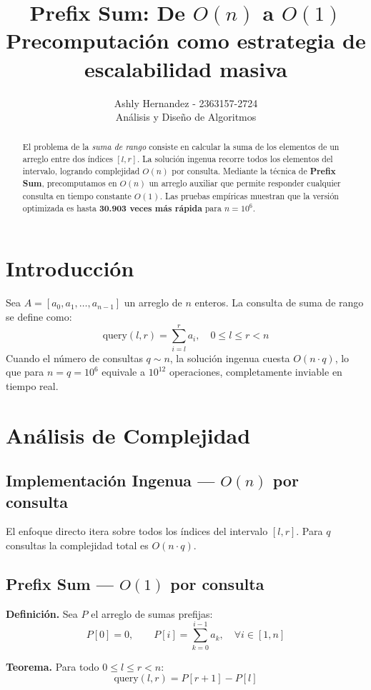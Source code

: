 \documentclass[twocolumn]{article}
\title{\textbf{Prefix Sum: De $O(n)$ a $O(1)$}\\
\large Precomputación como estrategia de escalabilidad masiva}
\author{Ashly Hernandez - 2363157-2724\\
\small Análisis y Diseño de Algoritmos}
\date{}
\begin{document}
\maketitle

\begin{abstract}
El problema de la \textit{suma de rango} consiste en calcular la suma de los
elementos de un arreglo entre dos índices $[l, r]$.
La solución ingenua recorre todos los elementos del intervalo, logrando
complejidad $O(n)$ por consulta.
Mediante la técnica de \textbf{Prefix Sum}, precomputamos en $O(n)$ un arreglo
auxiliar que permite responder cualquier consulta en tiempo constante $O(1)$.
Las pruebas empíricas muestran que la versión optimizada es hasta
\textbf{30.903 veces más rápida} para $n = 10^6$.
\end{abstract}

\section{Introducción}
Sea $A = [a_0, a_1, \ldots, a_{n-1}]$ un arreglo de $n$ enteros.
La consulta de suma de rango se define como:
\[
\text{query}(l, r) = \sum_{i=l}^{r} a_i, \quad 0 \le l \le r < n
\]
Cuando el número de consultas $q \sim n$, la solución ingenua cuesta
$O(n \cdot q)$, lo que para $n = q = 10^6$ equivale a $10^{12}$ operaciones,
completamente inviable en tiempo real.

\section{Análisis de Complejidad}

\subsection{Implementación Ingenua --- $O(n)$ por consulta}
El enfoque directo itera sobre todos los índices del intervalo $[l, r]$.
Para $q$ consultas la complejidad total es $O(n \cdot q)$.

\subsection{Prefix Sum --- $O(1)$ por consulta}
\textbf{Definición.} Sea $P$ el arreglo de sumas prefijas:
\[
P[0] = 0, \qquad P[i] = \sum_{k=0}^{i-1} a_k, \quad \forall i \in [1, n]
\]

\textbf{Teorema.} Para todo $0 \le l \le r < n$:
\[
\text{query}(l, r) = P[r+1] - P[l]
\]
\end{document}

